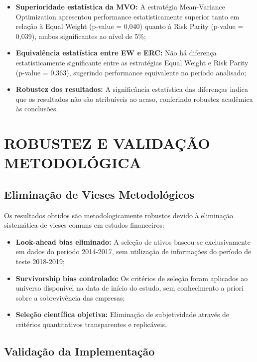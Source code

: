 \begin{itemize}
    \item \textbf{Superioridade estatística da MVO:} A estratégia Mean-Variance Optimization apresentou performance estatisticamente superior tanto em relação à Equal Weight (p-value = 0,040) quanto à Risk Parity (p-value = 0,039), ambos significantes ao nível de 5\%;
    
    \item \textbf{Equivalência estatística entre EW e ERC:} Não há diferença estatisticamente significante entre as estratégias Equal Weight e Risk Parity (p-value = 0,363), sugerindo performance equivalente no período analisado;
    
    \item \textbf{Robustez dos resultados:} A significância estatística das diferenças indica que os resultados não são atribuíveis ao acaso, conferindo robustez acadêmica às conclusões.
\end{itemize}

\section{ROBUSTEZ E VALIDAÇÃO METODOLÓGICA}

\subsection{Eliminação de Vieses Metodológicos}

Os resultados obtidos são metodologicamente robustos devido à eliminação sistemática de vieses comuns em estudos financeiros:

\begin{itemize}
    \item \textbf{Look-ahead bias eliminado:} A seleção de ativos baseou-se exclusivamente em dados do período 2014-2017, sem utilização de informações do período de teste 2018-2019;
    
    \item \textbf{Survivorship bias controlado:} Os critérios de seleção foram aplicados ao universo disponível na data de início do estudo, sem conhecimento a priori sobre a sobrevivência das empresas;
    
    \item \textbf{Seleção científica objetiva:} Eliminação de subjetividade através de critérios quantitativos transparentes e replicáveis.
\end{itemize}

\subsection{Validação da Implementação}

